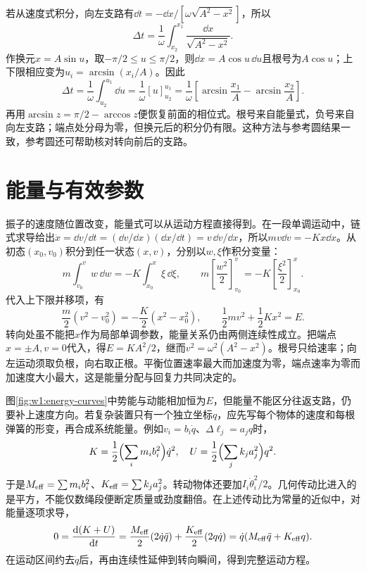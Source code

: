 若从速度式积分，向左支路有$\dd t=-\dd x/[\omega\sqrt{A^2-x^2}]$，所以
\[
\Delta t=\frac1\omega\int_{x_2}^{x_1}\frac{\dd x}{\sqrt{A^2-x^2}}.
\]
作换元$x=A\sin u$，取$-\pi/2\le u\le\pi/2$，则$\dd x=A\cos u\,\dd u$且根号为$A\cos u$；上下限相应变为$u_i=\arcsin(x_i/A)$。因此
\[
\Delta t=\frac1\omega\int_{u_2}^{u_1}\dd u
=\frac1\omega[u]_{u_2}^{u_1}
=\frac1\omega\left[\arcsin\frac{x_1}{A}-\arcsin\frac{x_2}{A}\right].
\]
再用$\arcsin z=\pi/2-\arccos z$便恢复前面的相位式。根号来自能量式，负号来自向左支路；端点处分母为零，但换元后的积分仍有限。这种方法与参考圆结果一致，参考圆还可帮助核对转向前后的支路。

\section{能量与有效参数}
振子的速度随位置改变，能量式可以从运动方程直接得到。在一段单调运动中，链式求导给出$\ddot x=\dd v/\dd t=(\dd v/\dd x)(\dd x/\dd t)=v\,\dd v/\dd x$，所以$m v\dd v=-Kx\dd x$。从初态$(x_0,v_0)$积分到任一状态$(x,v)$，分别以$w,\xi$作积分变量：
\[
m\int_{v_0}^{v}w\,\dd w=-K\int_{x_0}^{x}\xi\,\dd\xi,
\qquad m\left[\frac{w^2}{2}\right]_{v_0}^{v}
=-K\left[\frac{\xi^2}{2}\right]_{x_0}^{x}.
\]
代入上下限并移项，有
\[
\frac m2(v^2-v_0^2)=-\frac K2(x^2-x_0^2),\qquad
\frac12mv^2+\frac12Kx^2=E.
\]
转向处虽不能把$x$作为局部单调参数，能量关系仍由两侧连续性成立。把端点$x=\pm A,v=0$代入，得$E=KA^2/2$，继而$v^2=\omega^2(A^2-x^2)$。根号只给速率；向左运动须取负根，向右取正根。平衡位置速率最大而加速度为零，端点速率为零而加速度大小最大，这是能量分配与回复力共同决定的。


图\ref{fig:w1:energy-curves}中势能与动能相加恒为$E$，但能量不能区分往返支路，仍要补上速度方向。若复杂装置只有一个独立坐标$q$，应先写每个物体的速度和每根弹簧的形变，再合成系统能量。例如$v_i=b_i\dot q$、$\Delta\ell_j=a_jq$时，
\[
K=\frac12\Bigl(\sum_i m_ib_i^2\Bigr)\dot q^2,
\quad U=\frac12\Bigl(\sum_j k_ja_j^2\Bigr)q^2.
\]
于是$M_{\rm eff}=\sum m_ib_i^2$、$K_{\rm eff}=\sum k_ja_j^2$。转动物体还要加$I_i\dot\theta_i^2/2$。几何传动比进入的是平方，不能仅数绳段便断定质量或劲度翻倍。在上述传动比为常量的近似中，对能量逐项求导，
\[
0=\frac{\mathop{}\!\mathrm d(K+U)}{\mathop{}\!\mathrm d t}
=\frac{M_{\rm eff}}2(2\dot q\ddot q)
+\frac{K_{\rm eff}}2(2q\dot q)
=\dot q(M_{\rm eff}\ddot q+K_{\rm eff}q).
\]
在运动区间约去$\dot q$后，再由连续性延伸到转向瞬间，得到完整运动方程。

